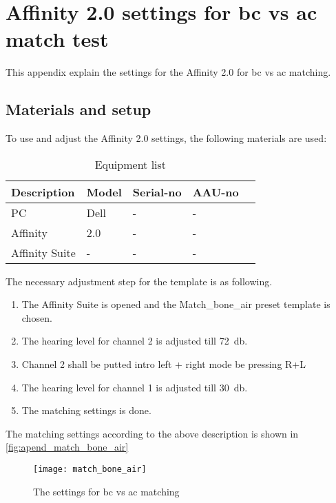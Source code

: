 \chapter*{Affinity 2.0 settings for \gls{bc} vs \gls{ac} match test}
\label{apend:aff_bc_ac_match}
This appendix explain the settings for the Affinity 2.0 for \gls{bc} vs \gls{ac} matching.

\section*{Materials and setup}
To use and adjust the Affinity 2.0 settings, the following materials are used:


\begin{table}[H]
\centering
\caption{Equipment list}
\begin{tabular}{l|l|l|l l}
Description         	& Model                                        & Serial-no  						& AAU-no \\ \hline
PC        			 		& Dell                                   & -  			& -  \\
Affinity     				& 2.0                            				& -   									& -  \\
Affinity Suite			& -                            				& -   									& - 
\end{tabular}
\end{table}

The necessary adjustment step for the template is as following.

\begin{enumerate}
\item The Affinity Suite is opened and the Match_bone_air preset template is chosen.
\item The hearing level for channel 2 is adjusted till \SI{72}{\decibel}.
\item  Channel 2 shall be putted intro left + right mode be pressing R+L
\item  The hearing level for channel 1 is adjusted till \SI{30}{\decibel}.
\item The matching settings is done.
\end{enumerate}

The matching settings according to the above description is shown in \autoref{fig:apend_match_bone_air}

\begin{figure}[H]
	\centering
		\texttt{[image: match\_bone\_air]}
		\caption{The settings for  \gls{bc} vs \gls{ac} matching}
		\label{fig:apend_match_bone_air}
\end{figure}





